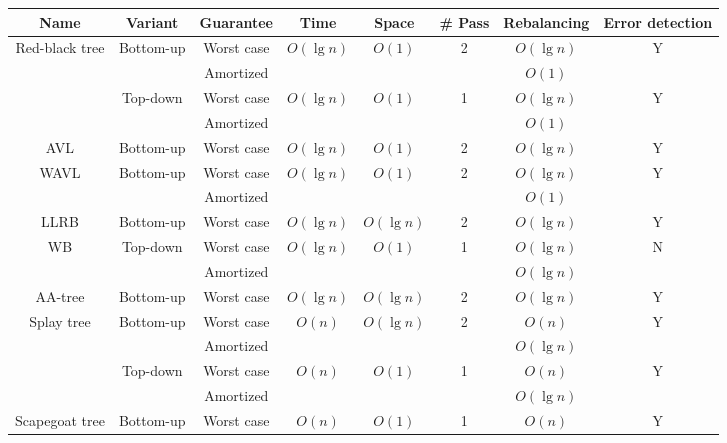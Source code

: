 \begin{table}[!t]
\begin{threeparttable}
\begin{tabular}{cccccccc}
 Name & Variant & Guarantee & Time & Space & \# Pass & Rebalancing & Error detection  \\
 \hline
 \multirow{4}{*}{Red-black tree} & \multirow{2}{*}{Bottom-up} & Worst case & \multirow{2}{*}{$O(\lg n)$} & \multirow{2}{*}{$O(1)$} & \multirow{2}{*}{2} & $O(\lg n)$\tnote{1} & \multirow{2}{*}{Y} \\
  & & Amortized & &  &  & $O(1)$ &  \\
  \cline{2-8}
  & \multirow{2}{*}{Top-down} & Worst case & \multirow{2}{*}{$O(\lg n)$} & \multirow{2}{*}{$O(1)$} & \multirow{2}{*}{1} & $O(\lg n)$ & \multirow{2}{*}{Y} \\
  & & Amortized & & &  & $O(1)$\tnote{2} & \\
  \hline
  AVL & Bottom-up & Worst case & $O(\lg n)$ & $O(1)$ & 2 & $O(\lg n)$\tnote{3} & Y \\
  \hline
  \multirow{2}{*}{WAVL} & \multirow{2}{*}{Bottom-up} & Worst case & \multirow{2}{*}{$O(\lg n)$} & \multirow{2}{*}{$O(1)$} & \multirow{2}{*}{2} & $O(\lg n)$\tnote{4} & \multirow{2}{*}{Y} \\
  & & Amortized & & & & $O(1)$ & \\
  \hline
  LLRB & Bottom-up & Worst case & $O(\lg n)$ & $O(\lg n)$ & 2 & $O(\lg n)$ & Y \\
  \hline
  \multirow{2}{*}{WB} & \multirow{2}{*}{Top-down} & Worst case & \multirow{2}{*}{$O(\lg n)$} & \multirow{2}{*}{$O(1)$} & \multirow{2}{*}{1} & $O(\lg n)$ & \multirow{2}{*}{N\tnote{5}} \\
  & & Amortized &  & & & $O(\lg n)$\tnote{6} &  \\
  \hline
  AA-tree & Bottom-up & Worst case & $O(\lg n)$ & $O(\lg n)$ & 2 & $O(\lg n)$ & Y \\
  \hline
  \multirow{4}{*}{Splay tree} & \multirow{2}{*}{Bottom-up} & Worst case & \multirow{2}{*}{$O(n)$} & \multirow{2}{*}{$O(\lg n)$} & \multirow{2}{*}{2} & $O(n)$ & \multirow{2}{*}{Y} \\
  & & Amortized & &  & & $O(\lg n)$ & \\
   & \multirow{2}{*}{Top-down} & Worst case & \multirow{2}{*}{$O(n)$} & \multirow{2}{*}{$O(1)$} & \multirow{2}{*}{1} & $O(n)$ & \multirow{2}{*}{Y} \\
  & & Amortized & &  & & $O(\lg n)$ & \\
  \hline
  \multirow{2}{*}{Scapegoat tree} & \multirow{2}{*}{Bottom-up} & Worst case & $O(n)$ & \multirow{2}{*}{$O(1)$\tnote{7}} & \multirow{2}{*}{1} & $O(n)$ & \multirow{2}{*}{Y} \\

\end{tabular}
\end{threeparttable}
\end{table}

